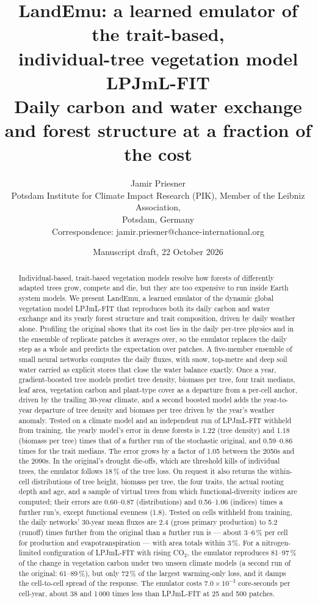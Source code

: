 \documentclass[11pt,a4paper]{article}
\title{\textbf{LandEmu: a learned emulator of the trait-based,\\ individual-tree vegetation model LPJmL-FIT}\\[4pt]\large Daily carbon and water exchange and forest structure at a fraction of the cost}
\author{Jamir Priesner\\[2pt]
\small Potsdam Institute for Climate Impact Research (PIK), Member of the Leibniz Association,\\
\small Potsdam, Germany\\
\small Correspondence: jamir.priesner@chance-international.org}
\date{Manuscript draft, 22 October 2026}
\begin{document}
\maketitle

\begin{abstract}
\noindent
Individual-based, trait-based vegetation models resolve how forests of differently adapted trees grow, compete and
die, but they are too expensive to run inside Earth system models. We present LandEmu, a learned emulator of the
dynamic global vegetation model LPJmL-FIT that reproduces both its daily carbon and water exchange and its yearly
forest structure and trait composition, driven by daily weather alone. Profiling the original shows that its cost lies
in the daily per-tree physics and in the ensemble of replicate patches it averages over, so the emulator replaces the
daily step as a whole and predicts the expectation over patches. A five-member ensemble of small neural networks
computes the daily fluxes, with snow, top-metre and deep soil water carried as explicit stores that close the water
balance exactly. Once a year, gradient-boosted tree models predict tree density, biomass per tree, four trait medians,
leaf area, vegetation carbon and plant-type cover as a departure from a per-cell anchor, driven by the trailing
30-year climate, and a second boosted model adds the year-to-year departure of tree density and biomass per tree
driven by the year's weather anomaly. Tested on a climate model and an independent run of LPJmL-FIT withheld from
training, the yearly model's error in dense forests is 1.22 (tree density) and 1.18 (biomass per tree) times that of
a further run of the stochastic original, and 0.59--0.86 times for the trait medians. The error grows by a factor of
1.05 between the 2050s and the 2090s. In the original's drought die-offs, which are threshold kills of individual
trees, the emulator follows 18\,\% of the tree loss. On request it also returns the within-cell distributions of tree
height, biomass per tree, the four traits, the actual rooting depth and age, and a sample of virtual trees from which
functional-diversity indices are computed; their errors are 0.60--0.87 (distributions) and 0.56--1.06 (indices) times
a further run's, except functional evenness (1.8). Tested on cells withheld from training, the daily networks' 30-year mean fluxes
are 2.4 (gross primary production) to 5.2 (runoff) times further from the original than a further run is --- about
3--6\,\% per cell for production and evapotranspiration --- with area totals within 3\,\%. For a nitrogen-limited
configuration of LPJmL-FIT with rising CO$_2$, the emulator reproduces 81--97\,\% of the change in vegetation carbon
under two unseen climate models (a second run of the original: 61--89\,\%), but only 72\,\% of the largest
warming-only loss, and it damps the cell-to-cell spread of the response. The emulator costs $7.0\times10^{-3}$
core-seconds per cell-year, about 38 and 1\,000 times less than LPJmL-FIT at 25 and 500 patches.
\end{abstract}
\end{document}
